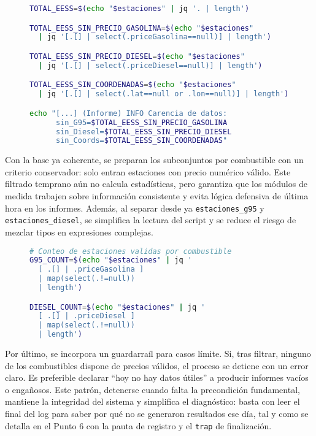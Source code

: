 \begin{figure}[H]
  \begin{lstlisting}[language=bash, caption={Figura 4.3 — Métricas de calidad del dato}]
TOTAL_EESS=$(echo "$estaciones" | jq '. | length')

TOTAL_EESS_SIN_PRECIO_GASOLINA=$(echo "$estaciones" 
  | jq '[.[] | select(.priceGasolina==null)] | length')

TOTAL_EESS_SIN_PRECIO_DIESEL=$(echo "$estaciones" 
  | jq '[.[] | select(.priceDiesel==null)] | length')

TOTAL_EESS_SIN_COORDENADAS=$(echo "$estaciones" 
  | jq '[.[] | select(.lat==null or .lon==null)] | length')

echo "[...] (Informe) INFO Carencia de datos: 
      sin_G95=$TOTAL_EESS_SIN_PRECIO_GASOLINA 
      sin_Diesel=$TOTAL_EESS_SIN_PRECIO_DIESEL 
      sin_Coords=$TOTAL_EESS_SIN_COORDENADAS"
\end{lstlisting}
\end{figure}

Con la base ya coherente, se preparan los subconjuntos por combustible con un criterio conservador: solo entran estaciones con precio numérico válido. Este filtrado temprano aún no calcula estadísticas, pero garantiza que los módulos de medida trabajen sobre información consistente y evita lógica defensiva de última hora en los informes. Además, al separar desde ya \texttt{estaciones\_g95} y \texttt{estaciones\_diesel}, se simplifica la lectura del script y se reduce el riesgo de mezclar tipos en expresiones complejas.

\begin{figure}[H]
  \begin{lstlisting}[language=bash, caption={Figura 4.4 — Filtrado por combustible}]
# Conteo de estaciones validas por combustible
G95_COUNT=$(echo "$estaciones" | jq '
  [ .[] | .priceGasolina ] 
  | map(select(.!=null)) 
  | length')

DIESEL_COUNT=$(echo "$estaciones" | jq '
  [ .[] | .priceDiesel ] 
  | map(select(.!=null)) 
  | length')
\end{lstlisting}
\end{figure}

Por último, se incorpora un guardarraíl para casos límite. Si, tras filtrar, ninguno de los combustibles dispone de precios válidos, el proceso se detiene con un error claro. Es preferible declarar ``hoy no hay datos útiles'' a producir informes vacíos o engañosos. Este patrón, detenerse cuando falta la precondición fundamental, mantiene la integridad del sistema y simplifica el diagnóstico: basta con leer el final del log para saber por qué no se generaron resultados ese día, tal y como se detalla en el Punto 6 con la pauta de registro y el \texttt{trap} de finalización.

